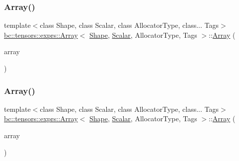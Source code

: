 \subsubsection{\texorpdfstring{Array()}{Array()}\hspace{0.1cm}{\footnotesize\ttfamily [2/9]}}
{\footnotesize\ttfamily template$<$class Shape, class Scalar, class Allocator\+Type, class... Tags$>$ \\
\hyperlink{structbc_1_1tensors_1_1exprs_1_1Array}{bc\+::tensors\+::exprs\+::\+Array}$<$ \hyperlink{structbc_1_1Shape}{Shape}, \hyperlink{namespacebc_aa12ac55ee2c43dc082894dd3859daee1}{Scalar}, Allocator\+Type, Tags $>$\+::\hyperlink{structbc_1_1tensors_1_1exprs_1_1Array}{Array} (\begin{DoxyParamCaption}\item[{const \hyperlink{structbc_1_1tensors_1_1exprs_1_1Array}{Array}$<$ \hyperlink{structbc_1_1Shape}{Shape}, \hyperlink{namespacebc_aa12ac55ee2c43dc082894dd3859daee1}{Scalar}, Allocator\+Type, Tags $>$ \&}]{array }\end{DoxyParamCaption})\hspace{0.3cm}{\ttfamily [inline]}}

\mbox{\label{structbc_1_1tensors_1_1exprs_1_1Array_a36469db9812dc419d20e87171a019998}} 
\subsubsection{\texorpdfstring{Array()}{Array()}\hspace{0.1cm}{\footnotesize\ttfamily [3/9]}}
{\footnotesize\ttfamily template$<$class Shape, class Scalar, class Allocator\+Type, class... Tags$>$ \\
\hyperlink{structbc_1_1tensors_1_1exprs_1_1Array}{bc\+::tensors\+::exprs\+::\+Array}$<$ \hyperlink{structbc_1_1Shape}{Shape}, \hyperlink{namespacebc_aa12ac55ee2c43dc082894dd3859daee1}{Scalar}, Allocator\+Type, Tags $>$\+::\hyperlink{structbc_1_1tensors_1_1exprs_1_1Array}{Array} (\begin{DoxyParamCaption}\item[{\hyperlink{structbc_1_1tensors_1_1exprs_1_1Array}{Array}$<$ \hyperlink{structbc_1_1Shape}{Shape}, \hyperlink{namespacebc_aa12ac55ee2c43dc082894dd3859daee1}{Scalar}, Allocator\+Type, Tags $>$ \&\&}]{array }\end{DoxyParamCaption})\hspace{0.3cm}{\ttfamily [inline]}}

